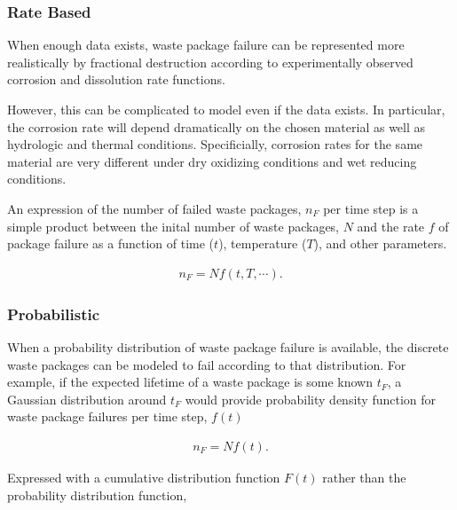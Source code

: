 \subsubsection{Rate Based} 

When enough data exists, waste package failure can
be represented more  realistically by fractional destruction according to
experimentally observed corrosion and dissolution rate functions.

However, this can be complicated to model even if the data exists. In
particular, the corrosion rate will depend dramatically on the chosen material 
as well as hydrologic and
thermal conditions. Specificially, corrosion rates for the same material are
very different under dry oxidizing conditions and wet reducing conditions. 


An expression of the number of failed waste packages, $n_F$ per time step is a simple 
product between the inital number of waste packages, $N$ and the rate $f$ of
package  failure as a function of time ($t$), temperature ($T$), and other 
parameters.

\begin{align}
  n_F = Nf(t,T,\cdots).
  \label{rate}
\end{align}

\subsubsection{Probabilistic}

When a probability distribution of waste package failure is available, the 
discrete waste packages can be modeled to fail according to that distribution. 
For example, if the expected lifetime of a waste package is some known $t_F$, a 
Gaussian distribution around $t_F$ would provide probability density function 
for waste package failures per time step, $f(t)$

\begin{align}
  n_F=Nf(t).
  \label{probabilistic}
\end{align}

Expressed with a cumulative distribution function $F(t)$ rather than the
probability distribution function, 


